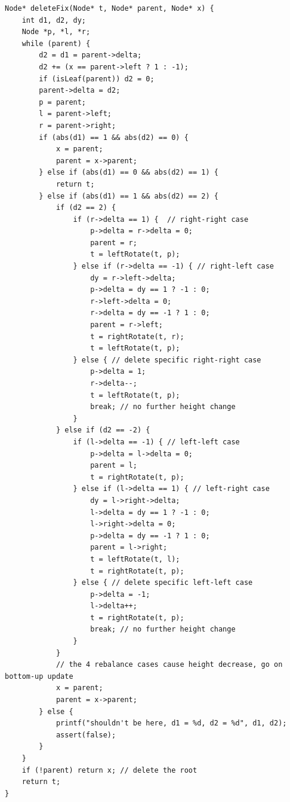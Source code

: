 \documentclass[b5paper]{article}
\begin{document}
\begin{lstlisting}
Node* deleteFix(Node* t, Node* parent, Node* x) {
    int d1, d2, dy;
    Node *p, *l, *r;
    while (parent) {
        d2 = d1 = parent->delta;
        d2 += (x == parent->left ? 1 : -1);
        if (isLeaf(parent)) d2 = 0;
        parent->delta = d2;
        p = parent;
        l = parent->left;
        r = parent->right;
        if (abs(d1) == 1 && abs(d2) == 0) {
            x = parent;
            parent = x->parent;
        } else if (abs(d1) == 0 && abs(d2) == 1) {
            return t;
        } else if (abs(d1) == 1 && abs(d2) == 2) {
            if (d2 == 2) {
                if (r->delta == 1) {  // right-right case
                    p->delta = r->delta = 0;
                    parent = r;
                    t = leftRotate(t, p);
                } else if (r->delta == -1) { // right-left case
                    dy = r->left->delta;
                    p->delta = dy == 1 ? -1 : 0;
                    r->left->delta = 0;
                    r->delta = dy == -1 ? 1 : 0;
                    parent = r->left;
                    t = rightRotate(t, r);
                    t = leftRotate(t, p);
                } else { // delete specific right-right case
                    p->delta = 1;
                    r->delta--;
                    t = leftRotate(t, p);
                    break; // no further height change
                }
            } else if (d2 == -2) {
                if (l->delta == -1) { // left-left case
                    p->delta = l->delta = 0;
                    parent = l;
                    t = rightRotate(t, p);
                } else if (l->delta == 1) { // left-right case
                    dy = l->right->delta;
                    l->delta = dy == 1 ? -1 : 0;
                    l->right->delta = 0;
                    p->delta = dy == -1 ? 1 : 0;
                    parent = l->right;
                    t = leftRotate(t, l);
                    t = rightRotate(t, p);
                } else { // delete specific left-left case
                    p->delta = -1;
                    l->delta++;
                    t = rightRotate(t, p);
                    break; // no further height change
                }
            }
            // the 4 rebalance cases cause height decrease, go on bottom-up update
            x = parent;
            parent = x->parent;
        } else {
            printf("shouldn't be here, d1 = %d, d2 = %d", d1, d2);
            assert(false);
        }
    }
    if (!parent) return x; // delete the root
    return t;
}
\end{lstlisting}
\end{document}

